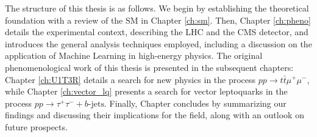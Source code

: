 The structure of this thesis is as follows. We begin by establishing the theoretical foundation with a review of the SM in Chapter \ref{ch:sm}. Then, Chapter \ref{ch:pheno} details the experimental context, describing the LHC and the CMS detector, and introduces the general analysis techniques employed, including a discussion on the application of Machine Learning in high-energy physics. The original phenomenological work of this thesis is presented in the subsequent chapters: Chapter \ref{ch:U1T3R} details a search for new physics in the process $pp \to t\bar{t}\mu^+\mu^-$, while Chapter \ref{ch:vector_lq} presents a search for vector leptoquarks in the process $pp \to \tau^+\tau^- + b\text{-jets}$. Finally, Chapter \label{ch:discussion} concludes by summarizing our findings and discussing their implications for the field, along with an outlook on future prospects.

